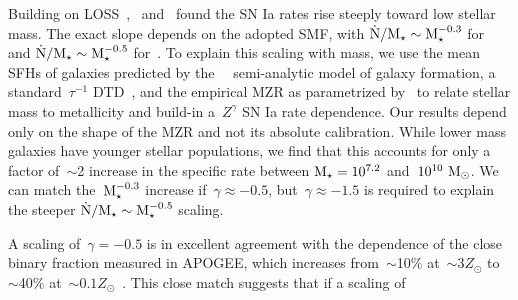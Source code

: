 \documentclass[foo.tex]{subfiles}
\begin{document}
Building on LOSS~\citep{Li2011},~\citet{Brown2019} and~\citet{Wiseman2021}
found the SN Ia rates rise steeply toward low stellar mass.
The exact slope depends on the adopted SMF, with
$\dot{\text{N}} / \text{M}_\star \sim \text{M}_\star^{-0.3}$ for~\citet{Baldry2012} and
$\dot{\text{N}} / \text{M}_\star \sim \text{M}_\star^{-0.5}$ for~\citet{Bell2003}.
To explain this scaling with mass, we use the mean SFHs of galaxies predicted
by the~\um~\citep{Behroozi2019} semi-analytic model of galaxy formation, a
standard~$\tau^{-1}$ DTD~\citep[e.g.,][]{Maoz2012a}, and the empirical MZR as
parametrized by~\citet{Zahid2014} to relate stellar mass to metallicity and
build-in a~$Z^\gamma$ SN Ia rate dependence.
Our results depend only on the shape of the MZR and not its absolute
calibration.
While lower mass galaxies have younger stellar populations, we find that this
accounts for only a factor of~$\sim$2 increase in the specific rate between
$\text{M}_\star = 10^{7.2}$ and~$10^{10}~\text{M}_\odot$.
We can match the~$\text{M}_\star^{-0.3}$ increase if~$\gamma \approx -0.5$,
but~$\gamma \approx -1.5$ is required to explain the steeper
$\dot{\text{N}} / \text{M}_\star \sim \text{M}_\star^{-0.5}$ scaling.
\par
A scaling of~$\gamma = -0.5$ is in excellent agreement with the dependence of
the close binary fraction measured in APOGEE, which increases from~$\sim$10\%
at~$\sim$$3Z_\odot$ to~$\sim$40\% at~$\sim$$0.1Z_\odot$~\citep{Moe2019}.
This close match suggests that if a scaling of
\end{document}
